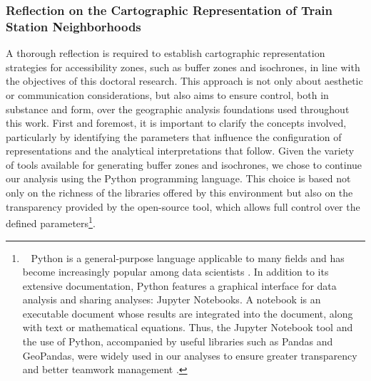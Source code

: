 \begin{refsegment}
\subsubsection*{Reflection on the Cartographic Representation of Train Station Neighborhoods
    \label{chap3:quartiers-gare-python}
    }

A thorough reflection is required to establish cartographic representation strategies for accessibility zones, such as buffer zones and isochrones, in line with the objectives of this doctoral research. This approach is not only about aesthetic or communication considerations, but also aims to ensure control, both in substance and form, over the geographic analysis foundations used throughout this work. First and foremost, it is important to clarify the concepts involved, particularly by identifying the parameters that influence the configuration of representations and the analytical interpretations that follow. Given the variety of tools available for generating buffer zones and isochrones, we chose to continue our analysis using the Python programming language. This choice is based not only on the richness of the libraries offered by this environment but also on the transparency provided by the open-source tool, which allows full control over the defined parameters\footnote{~
    Python is a general-purpose language applicable to many fields and has become increasingly popular among data scientists \textcolor{blue}{\autocite[19]{velt_python_2020}}. In addition to its extensive documentation, Python features a graphical interface for data analysis and sharing analyses: Jupyter Notebooks. A notebook is an executable document whose results are integrated into the document, along with text or mathematical equations. Thus, the Jupyter Notebook tool and the use of Python, accompanied by useful libraries such as Pandas and GeoPandas, were widely used in our analyses to ensure greater transparency and better teamwork management \textcolor{blue}{\autocite[55, 137]{velt_python_2020}}.
}.%


\end{refsegment}
